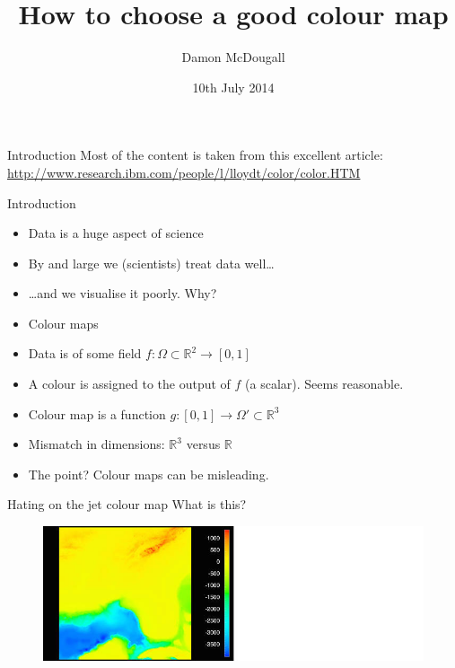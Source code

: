 \documentclass[10pt,presentation,compress]{beamer}
\title{How to choose a good colour map}
\author{Damon McDougall}
\institute{Institute for Computational and Engineering Sciences, UT Austin, USA}
\date{10th July 2014}
\begin{document}
\begin{frame}
  \titlepage
\end{frame}

\begin{frame}{Introduction}
  Most of the content is taken from this excellent article:
  \linebreak
  \linebreak
  \textcolor{blue}{\small{\url{http://www.research.ibm.com/people/l/lloydt/color/color.HTM}}}
\end{frame}

\begin{frame}{Introduction}
  \begin{itemize}
    \item Data is a huge aspect of science
    \item By and large we (scientists) treat data well\dots
    \item \dots and we visualise it poorly.  Why?
    \item Colour maps
    \item Data is of some field
      $f : \Omega \subset \mathbb{R}^2 \to [0, 1]$
    \item A colour is assigned to the output of $f$ (a scalar).  Seems
      reasonable.
    \item Colour map is a function
      $g : [0, 1] \to \Omega' \subset \mathbb{R}^3$
    \item Mismatch in dimensions:  $\mathbb{R}^3$ versus $\mathbb{R}$
    \item The point?  Colour maps can be misleading.
  \end{itemize}
\end{frame}

\begin{frame}{Hating on the jet colour map}
  What is this?
  \begin{figure}[htp]
    \includegraphics[scale=7.0]{florida_masked.jpg}
  \end{figure}
\end{frame}
\end{document}
